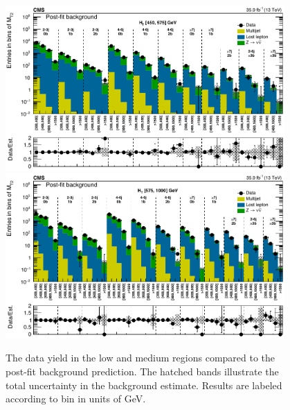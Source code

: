 \begin{figure}
	\centering
	\includegraphics[width=0.95\textwidth]{results/figs/postfit/mt2_lowHT_fullEstimate}
	\includegraphics[width=0.95\textwidth]{results/figs/postfit/mt2_mediumHT_fullEstimate}
	\caption{The data yield in the low \HT and medium \HT regions compared to the post-fit background prediction. The hatched bands illustrate the total uncertainty in the background estimate. Results are labeled according to \mttwo bin in units of GeV.}
	\label{fig:yieldPostfit2}
\end{figure}
